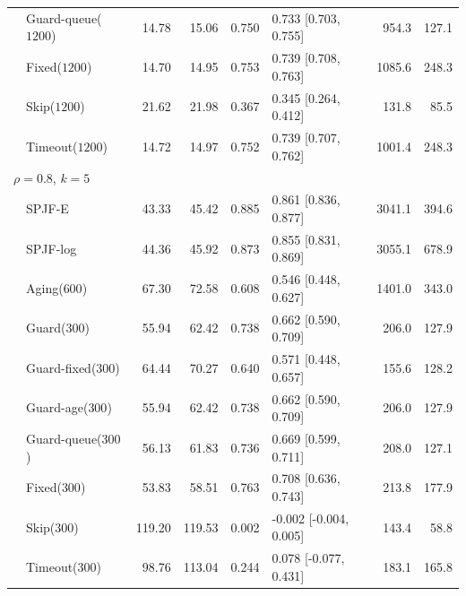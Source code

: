 \documentclass[mathematics,supfile,submit,moreauthors]{Definitions/mdpi}
\newcommand{\devnum}[1]{#1}
\begin{document}
\begin{table}[p]
\begin{tabular}{llrrrlrr}
 & Guard-queue($\devnum{1200}$) & \devnum{14.78} & \devnum{15.06} & \devnum{0.750} & \devnum{0.733 [0.703, 0.755]} & \devnum{954.3} & \devnum{127.1} \\
 & Fixed($\devnum{1200}$) & \devnum{14.70} & \devnum{14.95} & \devnum{0.753} & \devnum{0.739 [0.708, 0.763]} & \devnum{1085.6} & \devnum{248.3} \\
 & Skip($\devnum{1200}$)  & \devnum{21.62} & \devnum{21.98} & \devnum{0.367} & \devnum{0.345 [0.264, 0.412]} & \devnum{131.8} & \devnum{85.5} \\
 & Timeout($\devnum{1200}$) & \devnum{14.72} & \devnum{14.97} & \devnum{0.752} & \devnum{0.739 [0.707, 0.762]} & \devnum{1001.4} & \devnum{248.3} \\
\midrule
\multicolumn{8}{l}{$\rho = \devnum{0.8}$, $k = \devnum{5}$} \\
 & SPJF-E                 & \devnum{43.33} & \devnum{45.42} & \devnum{0.885} & \devnum{0.861 [0.836, 0.877]} & \devnum{3041.1} & \devnum{394.6} \\
 & SPJF-log               & \devnum{44.36} & \devnum{45.92} & \devnum{0.873} & \devnum{0.855 [0.831, 0.869]} & \devnum{3055.1} & \devnum{678.9} \\
 & Aging($\devnum{600}$)  & \devnum{67.30} & \devnum{72.58} & \devnum{0.608} & \devnum{0.546 [0.448, 0.627]} & \devnum{1401.0} & \devnum{343.0} \\
 & Guard($\devnum{300}$)  & \devnum{55.94} & \devnum{62.42} & \devnum{0.738} & \devnum{0.662 [0.590, 0.709]} & \devnum{206.0} & \devnum{127.9} \\
 & Guard-fixed($\devnum{300}$) & \devnum{64.44} & \devnum{70.27} & \devnum{0.640} & \devnum{0.571 [0.448, 0.657]} & \devnum{155.6} & \devnum{128.2} \\
 & Guard-age($\devnum{300}$) & \devnum{55.94} & \devnum{62.42} & \devnum{0.738} & \devnum{0.662 [0.590, 0.709]} & \devnum{206.0} & \devnum{127.9} \\
 & Guard-queue($\devnum{300}$) & \devnum{56.13} & \devnum{61.83} & \devnum{0.736} & \devnum{0.669 [0.599, 0.711]} & \devnum{208.0} & \devnum{127.1} \\
 & Fixed($\devnum{300}$)  & \devnum{53.83} & \devnum{58.51} & \devnum{0.763} & \devnum{0.708 [0.636, 0.743]} & \devnum{213.8} & \devnum{177.9} \\
 & Skip($\devnum{300}$)   & \devnum{119.20} & \devnum{119.53} & \devnum{0.002} & \devnum{-0.002 [-0.004, 0.005]} & \devnum{143.4} & \devnum{58.8} \\
 & Timeout($\devnum{300}$) & \devnum{98.76} & \devnum{113.04} & \devnum{0.244} & \devnum{0.078 [-0.077, 0.431]} & \devnum{183.1} & \devnum{165.8} \\

\end{tabular}
\end{table}
\end{document}
